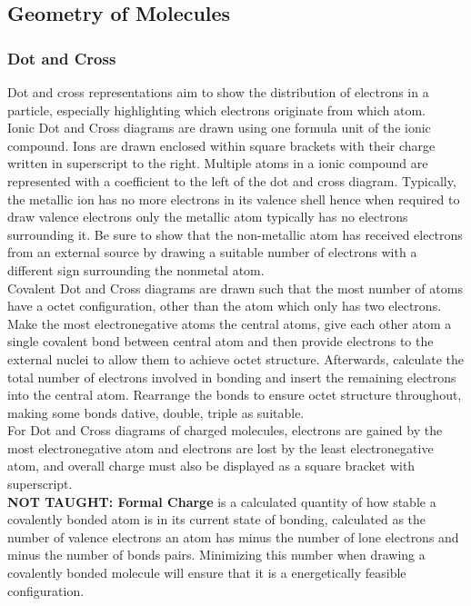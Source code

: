\documentclass[../main]{subfiles}
\begin{document}
	\subsection{Geometry of Molecules}

	\subsubsection{Dot and Cross}

	Dot and cross representations aim to show the distribution of electrons in a particle, especially highlighting which electrons originate from which atom. \\

	Ionic Dot and Cross diagrams are drawn using one formula unit of the ionic compound. Ions are drawn enclosed within square brackets with their charge written in superscript to the right. Multiple atoms in a ionic compound are represented with a coefficient to the left of the dot and cross diagram. Typically, the metallic ion has no more electrons in its valence shell hence when required to draw valence electrons only the metallic atom typically has no electrons surrounding it. Be sure to show that the non-metallic atom has received electrons from an external source by drawing a suitable number of electrons with a different sign surrounding the nonmetal atom. \\

	Covalent Dot and Cross diagrams are drawn such that the most number of atoms have a octet configuration, other than the  atom which only has two electrons. Make the most electronegative atoms the central atoms, give each other atom a single covalent bond between central atom and then provide electrons to the external nuclei to allow them to achieve octet structure. Afterwards, calculate the total number of electrons involved in bonding and insert the remaining electrons into the central atom. Rearrange the bonds to ensure octet structure throughout, making some bonds dative, double, triple as suitable.\\

	For Dot and Cross diagrams of charged molecules, electrons are gained by the most electronegative atom and electrons are lost by the least electronegative atom, and overall charge must also be displayed as a square bracket with superscript. \\

	\textbf{NOT TAUGHT: Formal Charge} is a calculated quantity of how stable a covalently bonded atom is in its current state of bonding, calculated as the number of valence electrons an atom has minus the number of lone electrons and minus the number of bonds pairs. Minimizing this number when drawing a covalently bonded molecule will ensure that it is a energetically feasible configuration.
\end{document}
